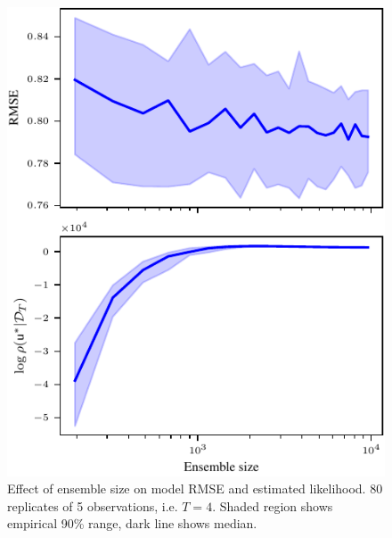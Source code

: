 
\begin{figure}[h!t]
    \centering
     \includegraphics[scale=1]{meth_ex_ens_5.pdf}
    \centering
    \caption{Effect of ensemble size on model RMSE and estimated likelihood. 80 replicates of 5 observations, i.e. \(T=4\). Shaded region shows empirical 90\% range, dark line shows median.}
    \label{fig:n_ens}
\end{figure}
